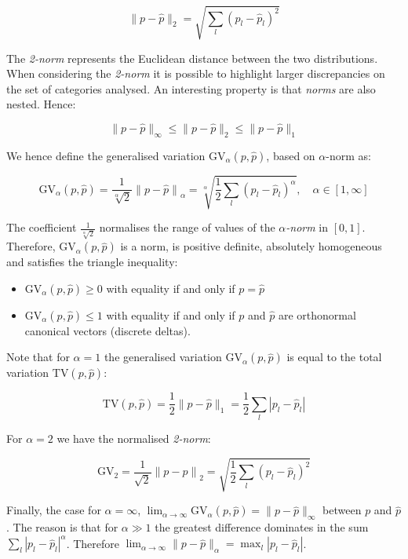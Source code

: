 $$ \| p - \hat{p} \|_2 = \sqrt{\sum_l{ {( {p_{l} - \hat{p}_{l}} )}^2 }} $$

The \emph{2-norm} represents the Euclidean distance between the two distributions. When considering the \emph{2-norm} it is possible to highlight larger discrepancies on the set of categories analysed. An interesting property is that \emph{norms} are also nested. Hence:

$$ \| p - \hat{p} \|_\infty \leqslant \| p - \hat{p} \|_2 \leqslant \| p - \hat{p} \|_1 $$

We hence define the generalised variation $\text{GV}_\alpha(p, \hat{p})$, based on $\alpha$-norm as:

$$ \text{GV}_\alpha(p, \hat{p}) = \frac {1} {\sqrt[\alpha]{2}}  {\| p - \hat{p} \|}_\alpha =  \sqrt[\alpha]{{ {\frac {1} {2}} {\sum_l{ ( p_{l} - \hat{p}_{l})^\alpha }} }} ,\quad  \alpha \in [1,\infty]$$

The coefficient $\frac {1} {\sqrt[\alpha]{2}}$ normalises the range of values of the \emph{$\alpha$-norm} in $[0, 1]$. Therefore, $\text{GV}_\alpha(p, \hat{p})$ is a norm, is positive definite, absolutely homogeneous and satisfies the triangle inequality:

\begin{itemize}
 \item $\text{GV}_\alpha(p, \hat{p}) \geq 0 $ with equality if and only if $p = \hat{p}$
 \item $\text{GV}_\alpha(p, \hat{p}) \leq 1$ with equality if and only if $p$ and $\hat{p}$ are orthonormal canonical vectors (discrete deltas).
\end{itemize}

Note that for $\alpha = 1$ the generalised variation $\text{GV}_\alpha(p, \hat{p})$ is equal to the total variation $\text{TV}(p, \hat{p}) $:

$$ \text{TV}(p, \hat{p})= \frac {1} {2}  \| p - \hat{p} \|_1 =  \frac {1} {2} \sum_l{ | p_{l} - \hat{p}_{l} | } $$

For $\alpha = 2$ we have the normalised \emph{2-norm}:

$$ \text{GV}_2 = \frac {1} {\sqrt{2}}  {\| p - \hat{p} \|}_2 =  \sqrt{{\frac {1} {2}} { \sum_l{ (p_{l} - \hat{p}_{l})^2 } }} $$

Finally, the case for $\alpha = \infty$, $\lim_{\alpha\to\infty} \text{GV}_\alpha(p, \hat{p}) = \| p - \hat{p} \|_\infty $ between $p$ and $\hat{p}$. The reason is that for $\alpha \gg 1$ the greatest difference dominates in the sum $\sum_l{ {| p_l - \hat{p}_l |}^\alpha }$. Therefore $\lim_{\alpha\to\infty} \| p - \hat{p} \|_\alpha = \max_l { | p_l - \hat{p}_l | } $.

